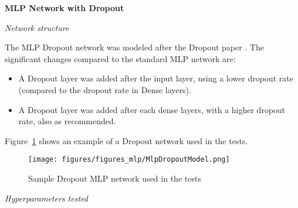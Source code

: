 \documentclass[../CAP6619_term_project_cgarbin.tex]{subfiles}
\begin{document}
\begin{table*}
\begin{tabular}{lrccrcrrccrrr}
\end{tabular}
\end{table*}

\medskip
\textbf{MLP Network with Dropout}

\smallskip
\textit{Network structure}

The MLP Dropout network was modeled after the Dropout paper \cite{Srivastava2014}. The significant changes compared to the standard MLP network are:

\begin{itemize}
\item A Dropout layer was added after the input layer, using a lower dropout rate (compared to the dropout rate in Dense layers).
\item A Dropout layer was added after each dense layers, with a higher dropout rate, also as recommended.
\end{itemize}

Figure~\ref{fig:MlpDropoutModel} shows an example of a Dropout network used in the tests.

\begin{figure}[htbp]
\centerline{\texttt{[image: figures/figures\_mlp/MlpDropoutModel.png]}}
\caption{Sample Dropout MLP network used in the tests}
\label{fig:MlpDropoutModel}
\end{figure}

\medskip
\textit{Hyperparameters tested}
\end{document}
